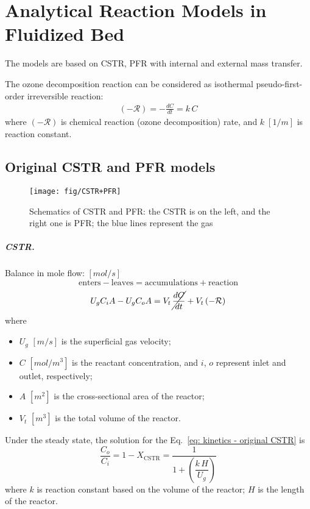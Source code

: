 \chapter{Analytical Reaction Models in Fluidized Bed}
The models are based on CSTR, PFR with internal and external mass transfer. 

The ozone decomposition reaction can be considered as isothermal pseudo-first-order irreversible reaction: 
\begin{align}
    (-\mathcal{R}) = -\frac{dC}{dt} = k\,C
\end{align}
where $(-\mathcal{R})$ is chemical reaction (ozone decomposition) rate, 
and $k \; [\si{1/m}]$ is reaction constant. 

\section{Original CSTR and PFR models}
\begin{figure}[h!]
    \raggedleft
    \texttt{[image: fig/CSTR+PFR]}
    \caption{Schematics of CSTR and PFR: the CSTR is on the left, and the right one is PFR; the blue lines represent the gas}
    \label{fig: CSTR + PFR} 
\end{figure}

\paragraph{CSTR. }
Balance in mole flow:
$[\si{mol/s}]$
\begin{equation*}
    \text{enters} - \text{leaves}
    = \text{accumulations} + \text{reaction}
\end{equation*}
\begin{equation}
    U_g C_i A - U_g C_o A 
    = V_t \, \cancel{\frac{dC}{dt}} 
    + V_t \,(\mathcal{-R})
    \label{eq: kinetics - original CSTR}
\end{equation}
where
\begin{itemize}
    \item $U_g$ $[\si{m/s}]$ is the superficial gas velocity;
    \item $C$ $[\si{mol/m^3}]$ is the reactant concentration, and $i$, $o$ represent inlet and outlet, respectively;
    \item $A$ $[\si{m^2}]$ is the cross-sectional area of the reactor;
    \item $V_t$ $[\si{m^3}]$ is the total volume of the reactor.
\end{itemize}

Under the steady state, the solution for the Eq.~\eqref{eq: kinetics - original CSTR} is 
\begin{equation}
    \frac{C_o}{C_i} = 1-X_\text{CSTR} 
    = \frac{1}{1+\left(\dfrac{k\,H}{U_g}\right)}
    \label{eq: solution - original - CSTR}
\end{equation}
where $k$ is reaction constant based on the volume of the reactor; 
$H$ is the length of the reactor.

